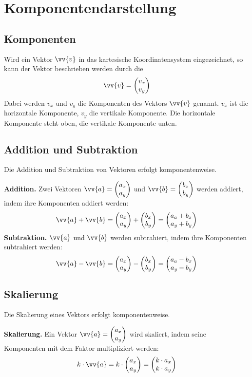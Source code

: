 \newpage
\section{Komponentendarstellung}

\subsection{Komponenten}

Wird ein Vektor $\vv{v}$ in das kartesische Koordinatensystem eingezeichnet, so kann der Vektor beschrieben werden durch die
\[
  \vv{v} = \vxy{v_{x},v_{y}}
\]
Dabei werden $v_{x}$ und $v_{y}$ die Komponenten des Vektors $\vv{v}$ genannt. $v_{x}$ ist die horizontale Komponente, $v_{y}$ die vertikale Komponente. Die horizontale Komponente steht oben, die vertikale Komponente unten.

\subsection{Addition und Subtraktion}
Die Addition und Subtraktion von Vektoren erfolgt komponentenweise.

\begin{theorem}
  \textbf{Addition.} Zwei Vektoren $\vv{a} = \vxy{a_{x},a_{y}}$ und $\vv{b} = \vxy{b_{x},b_{y}}$ werden addiert, indem ihre Komponenten addiert werden:
  \[
    \vv{a}+\vv{b} = \vxy{a_{x},a_{y}}+\vxy{b_{x},b_{y}} = \vxy{a_{a}+b_{x},a_{y}+b_{y}}
  \]
  \textbf{Subtraktion.} $\vv{a}$ und $\vv{b}$ werden subtrahiert, indem ihre Komponenten subtrahiert werden:
  \[
    \vv{a}-\vv{b} = \vxy{a_{x},a_{y}}-\vxy{b_{x},b_{y}} = \vxy{a_{a}-b_{x},a_{y}-b_{y}}
  \]

\end{theorem}

\subsection{Skalierung}

Die Skalierung eines Vektors erfolgt komponentenweise.

\begin{theorem}
  \textbf{Skalierung.} Ein Vektor  $\vv{a} = \vxy{a_{x},a_{y}}$ wird skaliert, indem seine Komponenten mit dem Faktor multipliziert werden:
  \[
    k\cdot\vv{a} = k\cdot\vxy{a_{x},a_{y}} = \vxy{k\cdot a_{x},k\cdot a_{y}}
  \]
\end{theorem}

